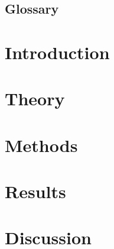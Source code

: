 \documentclass[12pt,a4paper,twoside,openright]{report}
\begin{document}



\newpage


\newpage


\newpage
\tableofcontents


\cleardoublepage
{} 
\listoffigures

\cleardoublepage
{}  
\listoftables

\newpage
\section*{Glossary}
    
\thispagestyle{plain}

\cleardoublepage
\setcounter{page}{1}
\setlength{\parskip}{10pt}


\chapter{Introduction}
    

\chapter{Theory}
    

\chapter{Methods}
    

\chapter{Results}
    

\chapter{Discussion}
    
\end{document}
